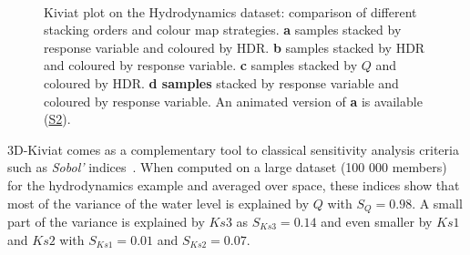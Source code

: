 \begin{figure}[!h]
~
\caption{Kiviat plot on the Hydrodynamics dataset: comparison of different stacking orders and colour map strategies. \textbf{a} samples stacked by response variable and coloured by HDR. \textbf{b} samples stacked by HDR and coloured by response variable. \textbf{c} samples stacked by $Q$ and coloured by HDR. \textbf{d samples} stacked by response variable and coloured by response variable. An animated version of \textbf{a} is available (\hyperref[S2]{S2}).}
\label{fig:Kiviat_order}
\end{figure}

3D-Kiviat comes as a complementary tool to classical sensitivity analysis criteria such as \emph{Sobol'} indices~\citep{Saltelli2007}. When computed on a large dataset (100 000 members) for the hydrodynamics example and averaged over space, these indices show that most of the variance of the water level is explained by $Q$ with $S_Q=0.98$. A small part of the variance is explained by $Ks3$ as $S_{Ks3} = 0.14$ and even smaller by $Ks1$ and $Ks2$ with $S_{Ks1}=0.01$ and $S_{Ks2} = 0.07$.

